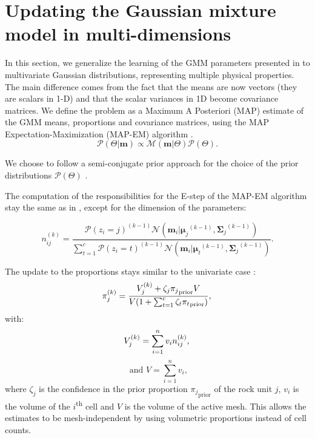 \section{Updating the Gaussian mixture model in multi-dimensions} \label{UpdateTheta}

In this section, we generalize the learning of the GMM parameters presented in \citet{ggz389} to multivariate Gaussian distributions, representing multiple physical properties. The main difference comes from the fact that the means are now vectors (they are scalars in 1-D) and that the scalar variances in 1D become covariance matrices. We define the problem as a Maximum A Posteriori (MAP) estimate of the GMM means, proportions and covariance matrices, using the MAP Expectation-Maximization (MAP-EM) algorithm \citep{ExpectationMaximization}.
\begin{equation}
\mathcal{P}(\Theta|\mathbf{m}) \propto \mathcal{M}(\mathbf{m}|\Theta)\mathcal{P}(\Theta).
\label{theta_posterior}
\end{equation}

We choose to follow a semi-conjugate prior approach for the choice of the prior distributions $\mathcal{P}(\Theta)$ \citep{ggz389, Murphy2012}.

The computation of the responsibilities for the E-step of the MAP-EM algorithm stay the same as in \citet{ggz389}, except for the dimension of the parameters:

\begin{equation}
n_{ij}^{(k)} = \frac{\mathcal{P}(z_i=j)^{(k-1)}\mathcal{N}(\mathbf{m}_i|{\mathbf{\mu}_j}^{(k-1)}, {\mathbf{\Sigma}_j}^{(k-1)})}{ \sum_{t=1}^c \mathcal{P}(z_i=t)^{(k-1)} \mathcal{N}({\mathbf{m}}_i|{\mathbf{\mu}_t}^{(k-1)}, {\mathbf{\Sigma}_j}^{(k-1)})} \label{eq:responsibilities}.
\end{equation}

The update to the proportions stays similar to the univariate case \citep{ggz389}:
\begin{equation}
{\pi}^{(k)}_j = \frac{V_{j}^{(k)}+\zeta_j {{\pi}_j}_{\text{prior}}V}{V(1+\sum_{t=1}^c \zeta_t {{\pi}_t}_{\text{prior}})} \label{eq:pi_update}, \\
\end{equation}
with:
\begin{equation}
V_{j}^{(k)} = \sum^n_{i=1} v_i n_{ij}^{(k)}, \label{VolumeProportions}\\
\end{equation}
\begin{equation}
\text{ and } V=\sum^n_{i=1} v_i,
\end{equation}
where $\zeta_j$ is the confidence in the prior proportion ${\pi_j}_{\text{prior}}$ of the rock unit $j$, $v_i$ is the volume of the $i$\textsuperscript{th} cell and $V$ is the volume of the
active mesh. This allows the estimates to be mesh-independent by using volumetric proportions instead of cell counts.

